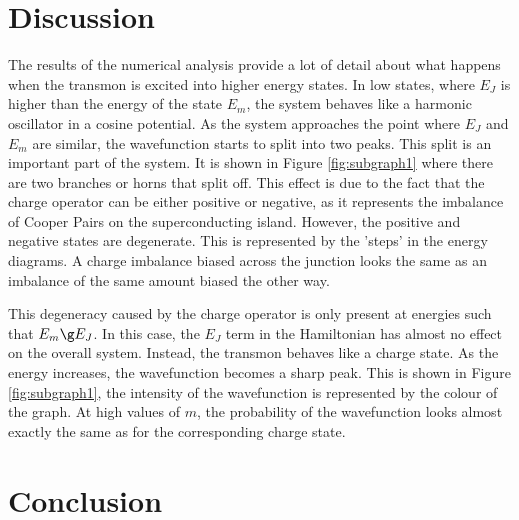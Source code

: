 \documentclass[11pt]{article}
\begin{document}
    \section{Discussion}
    The results of the numerical analysis provide a lot of detail about what happens when the transmon is excited into higher energy states. In low states, where $E_J$ is higher than the energy of the state $E_m$, the system behaves like a harmonic oscillator in a cosine potential. As the system approaches the point where $E_J$ and $E_m$ are similar, the wavefunction starts to split into two peaks. This split is an important part of the system. It is shown in Figure \ref{fig:subgraph1} where there are two branches or horns that split off. This effect is due to the fact that the charge operator can be either positive or negative, as it represents the imbalance of Cooper Pairs on the superconducting island. However, the positive and negative states are degenerate. This is represented by the 'steps' in the energy diagrams. A charge imbalance biased across the junction looks the same as an imbalance of the same amount biased the other way. 

This degeneracy caused by the charge operator is only present at energies such that $E_m \g E_J$. In this case, the $E_J$ term in the Hamiltonian has almost no effect on the overall system. Instead, the transmon behaves like a charge state.  As the energy increases, the wavefunction becomes a sharp peak. This is shown in Figure \ref{fig:subgraph1}, the intensity of the wavefunction is represented by the colour of the graph. At high values of $m$, the probability of the wavefunction looks almost exactly the same as for the corresponding charge state.

    \section{Conclusion}
\end{document}
